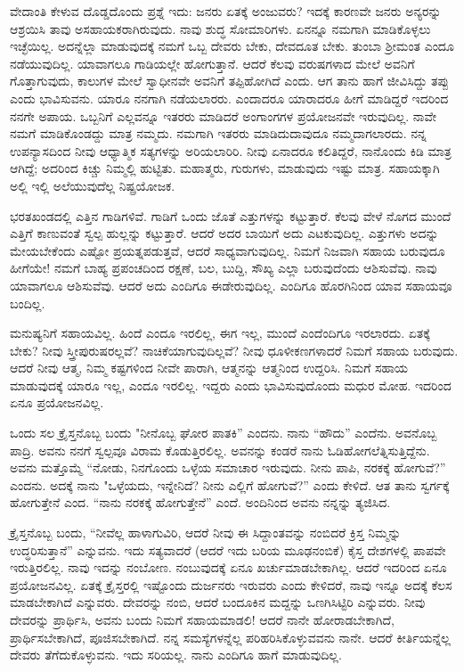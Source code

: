 ವೇದಾಂತಿ ಕೇಳುವ ದೊಡ್ಡದೊಂದು ಪ್ರಶ್ನೆ ಇದು: ಜನರು ಏತಕ್ಕೆ ಅಂಜುವರು? ಇದಕ್ಕೆ ಕಾರಣವೇ ಜನರು ಅನ್ಯರನ್ನು ಆಶ್ರಯಿಸಿ ತಾವು ಅಸಹಾಯಕರಾಗಿರುವುದು. ನಾವು ಶುದ್ಧ ಸೋಮಾರಿಗಳು. ಏನನ್ನೂ ನಮಗಾಗಿ ಮಾಡಿಕೊಳ್ಳಲು ಇಚ್ಛೆಯಿಲ್ಲ. ಅದನ್ನೆಲ್ಲಾ ಮಾಡುವುದಕ್ಕೆ ನಮಗೆ ಒಬ್ಬ ದೇವರು ಬೇಕು, ದೇವದೂತ ಬೇಕು. ತುಂಬಾ ಶ‍್ರೀಮಂತ ಎಂದೂ ನಡೆಯುವುದಿಲ್ಲ. ಯಾವಾಗಲೂ ಗಾಡಿಯಲ್ಲೇ ಹೋಗುತ್ತಾನೆ. ಆದರೆ ಕೆಲವು ವರುಷಗಳಾದ ಮೇಲೆ ಅವನಿಗೆ ಗೊತ್ತಾಗುವುದು, ಕಾಲುಗಳ ಮೇಲೆ ಸ್ವಾಧೀನವೇ ಅವನಿಗೆ ತಪ್ಪಿಹೋಗಿದೆ ಎಂದು. ಆಗ ತಾನು ಹಾಗೆ ಜೀವಿಸಿದ್ದು ತಪ್ಪು ಎಂದು ಭಾವಿಸುವನು. ಯಾರೂ ನನಗಾಗಿ ನಡೆಯಲಾರರು. ಎಂದಾದರೂ ಯಾರಾದರೂ ಹೀಗೆ ಮಾಡಿದ್ದರೆ ಇದರಿಂದ ನನಗೇ ಅಪಾಯ. ಒಬ್ಬನಿಗೆ ಎಲ್ಲವನ್ನೂ ಇತರರು ಮಾಡಿದರೆ ಅಂಗಾಂಗಗಳ ಪ್ರಯೋಜನವೇ ಇರುವುದಿಲ್ಲ. ನಾವೇ ನಮಗೆ ಮಾಡಿಕೊಂಡದ್ದು ಮಾತ್ರ ನಮ್ಮದು. ನಮಗಾಗಿ ಇತರರು ಮಾಡಿದುದಾವುದೂ ನಮ್ಮದಾಗಲಾರದು. ನನ್ನ ಉಪನ್ಯಾಸದಿಂದ ನೀವು ಆಧ್ಯಾತ್ಮಿಕ ಸತ್ಯಗಳನ್ನು ಅರಿಯಲಾರಿರಿ. ನೀವು ಏನಾದರೂ ಕಲಿತಿದ್ದರೆ, ನಾನೊಂದು ಕಿಡಿ ಮಾತ್ರ ಆಗಿದ್ದೆ; ಅದರಿಂದ ಕಿಚ್ಚು ನಿಮ್ಮಲ್ಲಿ ಹುಟ್ಟಿತು. ಮಹಾತ್ಮರು, ಗುರುಗಳು, ಮಾಡುವುದು ಇಷ್ಟು ಮಾತ್ರ. ಸಹಾಯಕ್ಕಾಗಿ ಅಲ್ಲಿ ಇಲ್ಲಿ ಅಲೆಯುವುದೆಲ್ಲ ನಿಷ್ಪ್ರಯೋಜಕ.

ಭರತಖಂಡದಲ್ಲಿ ಎತ್ತಿನ ಗಾಡಿಗಳಿವೆ. ಗಾಡಿಗೆ ಒಂದು ಜೊತೆ ಎತ್ತುಗಳನ್ನು ಕಟ್ಟುತ್ತಾರೆ. ಕೆಲವು ವೇಳೆ ನೊಗದ ಮುಂದೆ ಎತ್ತಿಗೆ ಕಾಣುವಂತೆ ಸ್ವಲ್ಪ ಹುಲ್ಲನ್ನು ಕಟ್ಟುತ್ತಾರೆ. ಆದರೆ ಅದರ ಬಾಯಿಗೆ ಅದು ಎಟಕುವುದಿಲ್ಲ. ಎತ್ತುಗಳು ಅದನ್ನು ಮೇಯಬೇಕೆಂದು ಎಷ್ಟೋ ಪ್ರಯತ್ನಪಡುತ್ತವೆ, ಆದರೆ ಸಾಧ್ಯವಾಗುವುದಿಲ್ಲ. ನಿಮಗೆ ನಿಜವಾಗಿ ಸಹಾಯ ಬರುವುದೂ ಹೀಗೆಯೇ! ನಮಗೆ ಬಾಹ್ಯ ಪ್ರಪಂಚದಿಂದ ರಕ್ಷಣೆ, ಬಲ, ಬುದ್ದಿ, ಸೌಖ್ಯ ಎಲ್ಲಾ ಬರುವುದೆಂದು ಆಶಿಸುವೆವು. ನಾವು ಯಾವಾಗಲೂ ಆಶಿಸುವೆವು. ಆದರೆ ಅದು ಎಂದಿಗೂ ಈಡೇರುವುದಿಲ್ಲ. ಎಂದಿಗೂ ಹೊರಗಿನಿಂದ ಯಾವ ಸಹಾಯವೂ ಬಂದಿಲ್ಲ.

ಮನುಷ್ಯನಿಗೆ ಸಹಾಯವಿಲ್ಲ. ಹಿಂದೆ ಎಂದೂ ಇರಲಿಲ್ಲ, ಈಗ ಇಲ್ಲ, ಮುಂದೆ ಎಂದೆಂದಿಗೂ ಇರಲಾರದು. ಏತಕ್ಕೆ ಬೇಕು? ನೀವು ಸ್ತ್ರೀಪುರುಷರಲ್ಲವೆ? ನಾಚಿಕೆಯಾಗುವುದಿಲ್ಲವೆ? ನೀವು ಧೂಳೀಕಣಗಳಾದರೆ ನಿಮಗೆ ಸಹಾಯ ಬರುವುದು. ಆದರೆ ನೀವು ಆತ್ಮ, ನಿಮ್ಮ ಕಷ್ಟಗಳಿಂದ ನೀವೇ ಪಾರಾಗಿ, ಆತ್ಮನನ್ನು ಆತ್ಮನಿಂದ ಉದ್ದರಿಸಿ. ನಿಮಗೆ ಸಹಾಯ ಮಾಡುವುದಕ್ಕೆ ಯಾರೂ ಇಲ್ಲ, ಎಂದೂ ಇರಲಿಲ್ಲ. ಇದ್ದರು ಎಂದು ಭಾವಿಸುವುದೊಂದು ಮಧುರ ಮೋಹ. ಇದರಿಂದ ಏನೂ ಪ್ರಯೋಜನವಿಲ್ಲ.

ಒಂದು ಸಲ ಕ್ರೈಸ್ತನೊಬ್ಬ ಬಂದು "ನೀನೊಬ್ಬ ಘೋರ ಪಾತಕಿ'' ಎಂದನು. ನಾನು “ಹೌದು” ಎಂದೆನು. ಅವನೊಬ್ಬ ಪಾದ್ರಿ. ಅವನು ನನಗೆ ಸ್ವಲ್ಪವೂ ವಿರಾಮ ಕೊಡುತ್ತಿರಲಿಲ್ಲ. ಅವನನ್ನು ಕಂಡರೆ ನಾನು ಓಡಿಹೋಗಲೆತ್ನಿಸುತ್ತಿದ್ದೆನು. ಅವನು ಮತ್ತೊಮ್ಮೆ “ನೋಡು, ನಿನಗೊಂದು ಒಳ್ಳೆಯ ಸಮಾಚಾರ ಇರುವುದು. ನೀನು ಪಾಪಿ, ನರಕಕ್ಕೆ ಹೋಗುವೆ?'' ಎಂದನು. ಅದಕ್ಕೆ ನಾನು "ಒಳ್ಳೆಯದು, ಇನ್ನೇನಿದೆ? ನೀನು ಎಲ್ಲಿಗೆ ಹೋಗುವೆ?” ಎಂದು ಕೇಳಿದೆ. ಆತ ತಾನು ಸ್ವರ್ಗಕ್ಕೆ ಹೋಗುತ್ತೇನೆ ಎಂದ. “ನಾನು ನರಕಕ್ಕೆ ಹೋಗುತ್ತೇನೆ'' ಎಂದೆ. ಅಂದಿನಿಂದ ಅವನು ನನ್ನನ್ನು ತ್ಯಜಿಸಿದ.

ಕ್ರೈಸ್ತನೊಬ್ಬ ಬಂದು, “ನೀವೆಲ್ಲ ಹಾಳಾಗುವಿರಿ, ಆದರೆ ನೀವು ಈ ಸಿದ್ದಾಂತವನ್ನು ನಂಬಿದರೆ ಕ್ರಿಸ್ತ ನಿಮ್ಮನ್ನು ಉದ್ಧರಿಸುತ್ತಾನೆ'' ಎನ್ನುವನು. ಇದು ಸತ್ಯವಾದರೆ (ಆದರೆ ಇದು ಬರಿಯ ಮೂಢನಂಬಿಕೆ) ಕೈಸ್ತ ದೇಶಗಳಲ್ಲಿ ಪಾಪವೇ ಇರುತ್ತಿರಲಿಲ್ಲ. ನಾವು ಇದನ್ನು ನಂಬೋಣ. ನಂಬುವುದಕ್ಕೆ ಏನೂ ಖರ್ಚುಮಾಡಬೇಕಾಗಿಲ್ಲ. ಆದರೆ ಇದರಿಂದ ಏನೂ ಪ್ರಯೋಜನವಿಲ್ಲ. ಏತಕ್ಕೆ ಕ್ರೈಸ್ತರಲ್ಲಿ ಇಷ್ಟೊಂದು ದುರ್ಜನರು ಇರುವರು ಎಂದು ಕೇಳಿದರೆ, ನಾವು ಇನ್ನೂ ಅದಕ್ಕೆ ಕೆಲಸ ಮಾಡಬೇಕಾಗಿದೆ ಎನ್ನುವರು. ದೇವರನ್ನು ನಂಬಿ, ಆದರೆ ಬಂದೂಕಿನ ಮದ್ದನ್ನು ಒಣಗಿಸಿಟ್ಟಿರಿ ಎನ್ನುವರು. ನೀವು ದೇವರನ್ನು ಪ್ರಾರ್ಥಿಸಿ, ಅವನು ಬಂದು ನಿಮಗೆ ಸಹಾಯಮಾಡಲಿ! ಆದರೆ ನಾನೇ ಹೋರಾಡಬೇಕಾಗಿದೆ, ಪ್ರಾರ್ಥಿಸಬೇಕಾಗಿದೆ, ಪೂಜಿಸಬೇಕಾಗಿದೆ. ನನ್ನ ಸಮಸ್ಯೆಗಳನ್ನೆಲ್ಲ ಪರಿಹರಿಸಿಕೊಳ್ಳುವವನು ನಾನೇ. ಆದರೆ ಕೀರ್ತಿಯನ್ನೆಲ್ಲ ದೇವರು ತೆಗೆದುಕೊಳ್ಳುವನು. ಇದು ಸರಿಯಲ್ಲ. ನಾನು ಎಂದಿಗೂ ಹಾಗೆ ಮಾಡುವುದಿಲ್ಲ.


